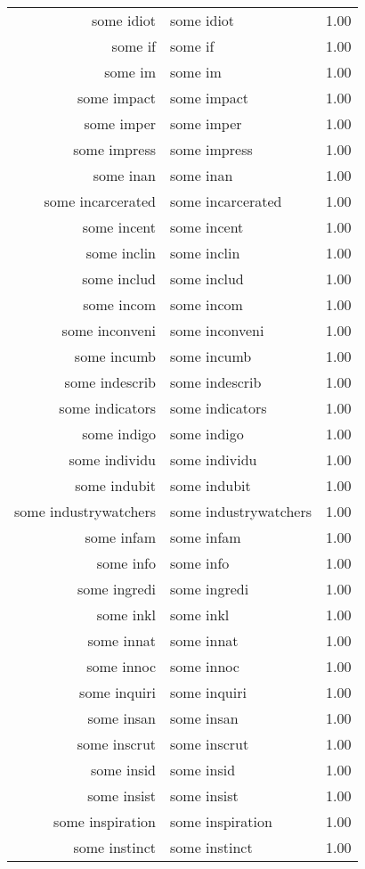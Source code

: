 \begin{table}[ht]
\begin{tabular}{rlr}
  some idiot & some idiot & 1.00 \\ 
  some if & some if & 1.00 \\ 
  some im & some im & 1.00 \\ 
  some impact & some impact & 1.00 \\ 
  some imper & some imper & 1.00 \\ 
  some impress & some impress & 1.00 \\ 
  some inan & some inan & 1.00 \\ 
  some incarcerated & some incarcerated & 1.00 \\ 
  some incent & some incent & 1.00 \\ 
  some inclin & some inclin & 1.00 \\ 
  some includ & some includ & 1.00 \\ 
  some incom & some incom & 1.00 \\ 
  some inconveni & some inconveni & 1.00 \\ 
  some incumb & some incumb & 1.00 \\ 
  some indescrib & some indescrib & 1.00 \\ 
  some indicators & some indicators & 1.00 \\ 
  some indigo & some indigo & 1.00 \\ 
  some individu & some individu & 1.00 \\ 
  some indubit & some indubit & 1.00 \\ 
  some industrywatchers & some industrywatchers & 1.00 \\ 
  some infam & some infam & 1.00 \\ 
  some info & some info & 1.00 \\ 
  some ingredi & some ingredi & 1.00 \\ 
  some inkl & some inkl & 1.00 \\ 
  some innat & some innat & 1.00 \\ 
  some innoc & some innoc & 1.00 \\ 
  some inquiri & some inquiri & 1.00 \\ 
  some insan & some insan & 1.00 \\ 
  some inscrut & some inscrut & 1.00 \\ 
  some insid & some insid & 1.00 \\ 
  some insist & some insist & 1.00 \\ 
  some inspiration & some inspiration & 1.00 \\ 
  some instinct & some instinct & 1.00 \\ 

\end{tabular}
\end{table}

